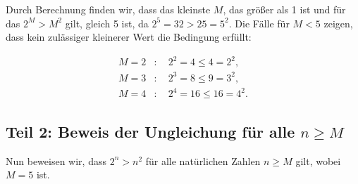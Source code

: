 \documentclass[12pt]{article}
\begin{document}
Durch Berechnung finden wir, dass das kleinste \( M \), das größer als 1 ist und für das \( 2^M > M^2 \) gilt, gleich 5 ist, da \( 2^5 = 32 > 25 = 5^2 \). Die Fälle für \( M < 5 \) zeigen, dass kein zulässiger kleinerer Wert die Bedingung erfüllt:

\begin{align*}
	M = 2 & : \quad 2^2 = 4 \leq 4 = 2^2,    \\
	M = 3 & : \quad 2^3 = 8 \leq 9 = 3^2,    \\
	M = 4 & : \quad 2^4 = 16 \leq 16 = 4^2.
\end{align*}

\subsection*{Teil 2: Beweis der Ungleichung für alle \( n \geq M \)}

Nun beweisen wir, dass \( 2^n > n^2 \) für alle natürlichen Zahlen \( n \geq M \) gilt, wobei \( M = 5 \) ist.
\end{document}
